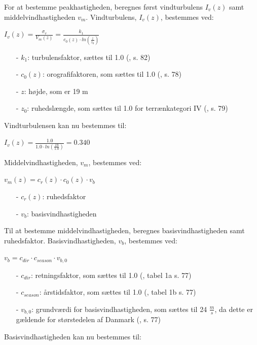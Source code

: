 For at bestemme peakhastigheden, beregnes først vindturbulens $I_v(z)$ samt middelvindhastigheden $v_m$.
\newline
\newline
Vindturbulens, $I_v(z)$, bestemmes ved:
\begin{center}
$I_v(z)=\frac{\sigma_v}{V_m(z)}=\frac{k_1}{c_0(z)\cdot ln(\frac{z}{z_0})}$
\end{center}
\begin{itemize}
	\item[-] $k_1$: turbulensfaktor, sættes til 1.0 (\citep{EU91}, s. 82)
	\item[-] $c_0(z)$: orografifaktoren, som sættes til 1.0 (\citep{EU91}, s. 78)
	\item[-] $z$: højde, som er 19 m
	\item[-] $z_0$: ruhedslængde, som sættes til 1.0 for terrænkategori IV (\citep{EU91}, s. 79)
\end{itemize}
Vindturbulensen kan nu bestemmes til:
\begin{center}
$I_v(z)=\frac{1.0}{1.0\cdot ln(\frac{19}{1.0})}=0.340$
\end{center}
Middelvindhastigheden, $v_m$, bestemmes ved:
\begin{center}
$v_m(z)=c_r(z)\cdot c_0(z)\cdot v_b$
\end{center}
\begin{itemize}
	\item[-] $c_r(z)$: ruhedsfaktor
	\item[-] $v_b$: basisvindhastigheden
\end{itemize}
Til at bestemme middelvindhastigheden, beregnes basisvindhastigheden samt ruhedsfaktor.
\newline
\newline
Basisvindhastigheden, $v_b$, bestemmes ved:
\begin{center}
$v_b=c_{dir}\cdot c_{season}\cdot v_{b,0}$
\end{center}
\begin{itemize}
	\item[-] $c_{dir}$: retningsfaktor, som sættes til 1.0 (\citep{EU91}, tabel 1a s. 77)
	\item[-] $c_{season}$: årstidsfaktor, som sættes til 1.0 (\citep{EU91}, tabel 1b s. 77)
	\item[-] $v_{b,0}$: grundværdi for basisvindhastigheden, som sættes til 24 $\frac{m}{s}$, da dette er gældende for størstedelen af Danmark (\citep{EU91}, s. 77)
\end{itemize}
Basisvindhastigheden kan nu bestemmes til:
